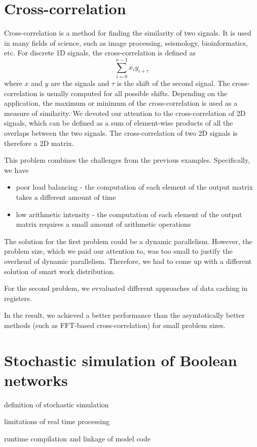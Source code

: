 \section{Cross-correlation}

Cross-correlation is a method for finding the similarity of two signals. It is used in many fields of science, such as image processing, seismology, bioinformatics, etc. For discrete 1D signals, the cross-correlation is defined as
$$ \sum_{i=0}^{n-1} x_i y_{i + \tau} $$
where $x$ and $y$ are the signals and $\tau$ is the shift of the second signal. The cross-correlation is usually computed for all possible shifts. Depending on the application, the maximum or minimum of the cross-correlation is used as a measure of similarity.
We devoted our attention to the cross-correlation of 2D signals, which can be defined as a sum of element-wise products of all the overlaps between the two signals. The cross-correlation of two 2D signals is therefore a 2D matrix.

This problem combines the challenges from the previous examples. Specifically, we have
\begin{itemize}
    \item poor load balancing - the computation of each element of the output matrix takes a different amount of time
    \item low arithmetic intensity - the computation of each element of the output matrix requires a small amount of arithmetic operations
\end{itemize}

The solution for the first problem could be a dynamic parallelism. However, the problem size, which we paid our attention to, was too small to justify the overhead of dynamic parallelism. Therefore, we had to come up with a different solution of smart work distribution.

For the second problem, we evvaluated different approaches of data caching in registers.

In the result, we achieved a better performance than the asymtotically better methods (such as FFT-based cross-correlation) for small problem sizes.

\section{Stochastic simulation of Boolean networks}

definition of stochastic simulation

limitations of real time processing

runtime compilation and linkage of model code